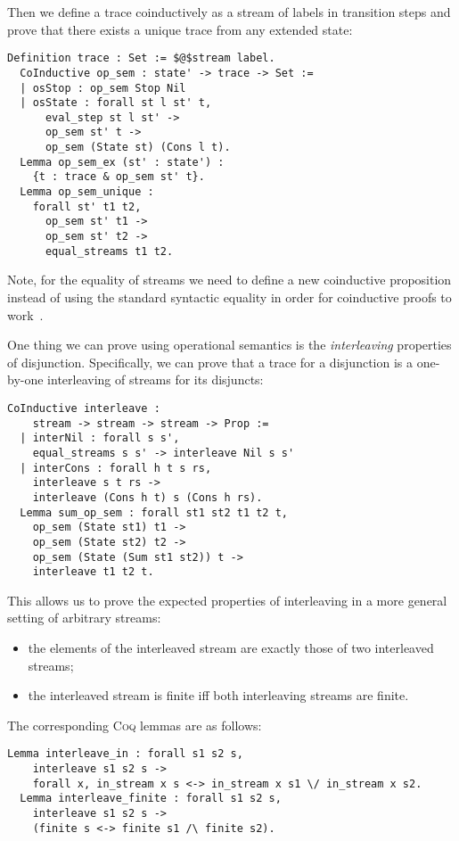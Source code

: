 Then we define a trace coinductively as a stream of labels in transition steps and prove that there exists a unique trace from any extended state:

\begin{lstlisting}[language=Coq,basicstyle=\footnotesize]
  Definition trace : Set := $@$stream label.
  CoInductive op_sem : state' -> trace -> Set :=
  | osStop : op_sem Stop Nil
  | osState : forall st l st' t,
      eval_step st l st' ->
      op_sem st' t ->
      op_sem (State st) (Cons l t).
  Lemma op_sem_ex (st' : state') :
    {t : trace & op_sem st' t}.
  Lemma op_sem_unique :
    forall st' t1 t2,
      op_sem st' t1 ->
      op_sem st' t2 ->
      equal_streams t1 t2.
\end{lstlisting}

Note, for the equality of streams we need to define a new coinductive proposition instead of using the standard syntactic equality in order for coinductive proofs to work~\cite{CPDT}.

One thing we can prove using operational semantics is the \emph{interleaving} properties of disjunction. Specifically, we can prove that a trace for a disjunction is
a one-by-one interleaving of streams for its disjuncts:

\begin{lstlisting}[language=Coq,basicstyle=\footnotesize]
  CoInductive interleave :
    stream -> stream -> stream -> Prop :=
  | interNil : forall s s',
    equal_streams s s' -> interleave Nil s s'
  | interCons : forall h t s rs,
    interleave s t rs ->
    interleave (Cons h t) s (Cons h rs).
  Lemma sum_op_sem : forall st1 st2 t1 t2 t,
    op_sem (State st1) t1 ->
    op_sem (State st2) t2 ->
    op_sem (State (Sum st1 st2)) t ->
    interleave t1 t2 t.
\end{lstlisting}

This allows us to prove the expected properties of interleaving in a more general setting of arbitrary streams:

\begin{itemize}
\item  the elements of the interleaved stream are exactly those of two interleaved streams;
\item  the interleaved stream is finite iff both interleaving streams are finite.
\end{itemize}

The corresponding \textsc{Coq} lemmas are as follows:

\begin{lstlisting}[language=Coq,basicstyle=\footnotesize]
  Lemma interleave_in : forall s1 s2 s,
    interleave s1 s2 s ->
    forall x, in_stream x s <-> in_stream x s1 \/ in_stream x s2.
  Lemma interleave_finite : forall s1 s2 s,
    interleave s1 s2 s ->
    (finite s <-> finite s1 /\ finite s2).
\end{lstlisting}


